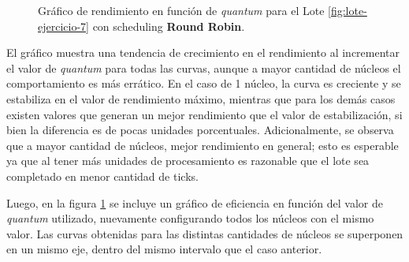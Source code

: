 \begin{figure}[h!t]
  \centering
  \caption{Gráfico de rendimiento en función de \textit{quantum} para el Lote \ref{fig:lote-ejercicio-7} con scheduling \textbf{Round Robin}.}
  \label{fig:rendimiento-comparacion}
\end{figure}

El gráfico muestra una tendencia de crecimiento en el rendimiento al incrementar el valor de \textit{quantum} para todas las curvas, aunque a mayor cantidad de núcleos el comportamiento es más errático. En el caso de 1 núcleo, la curva es creciente y se estabiliza en el valor de rendimiento máximo, mientras que para los demás casos existen valores que generan un mejor rendimiento que el valor de estabilización, si bien la diferencia es de pocas unidades porcentuales. Adicionalmente, se observa que a mayor cantidad de núcleos, mejor rendimiento en general; esto es esperable ya que al tener más unidades de procesamiento es razonable que el lote sea completado en menor cantidad de ticks.

Luego, en la figura \ref{fig:rendimiento-comparacion} se incluye un gráfico de eficiencia en función del valor de \textit{quantum} utilizado, nuevamente configurando todos los núcleos con el mismo valor. Las curvas obtenidas para las distintas cantidades de núcleos se superponen en un mismo eje, dentro del mismo intervalo que el caso anterior.

